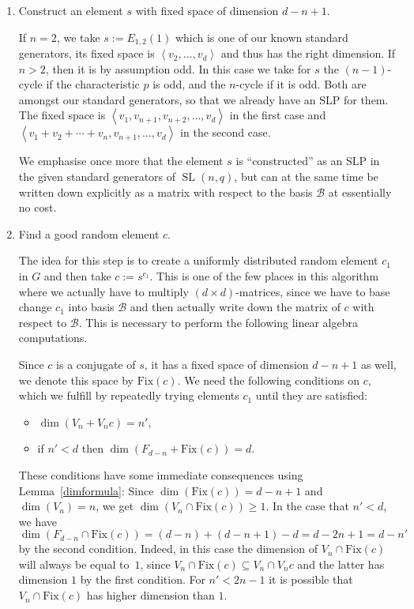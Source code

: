 \documentclass[a4paper,11pt]{article}
\def\SL{\operatorname{SL}}
\newcommand{\Fix}[1]{\mathrm{Fix}(#1)}
\newcommand{\B}{\mathcal{B}}
\begin{document}
\smallskip
\begin{enumerate}
\item Construct an element $s$ with fixed space of dimension $d-n+1$.

If $n=2$, we take $s := E_{1,2}(1)$ which is one of our known standard
generators, its fixed space is $\left< v_2, \ldots, v_d\right>$ and thus
has the right dimension. If $n > 2$, then it is by assumption odd.
In this case we take for $s$ the $(n-1)$-cycle if the characteristic $p$
is odd, and the $n$-cycle if it is odd. Both are amongst our
standard generators, so that we already have an SLP for them. The fixed
space is $\left< v_1, v_{n+1}, v_{n+2}, \ldots, v_d\right>$ in the first
case and $\left< v_1+v_2+\cdots+v_n, v_{n+1}, \ldots, v_d\right>$ in the
second case.

We emphasise once more that the element $s$ is ``constructed'' as an SLP in
the given standard generators of $\SL(n,q)$, but can at the same time be
written down explicitly as a matrix with respect to the basis $\B$ at
essentially no cost.
\item Find a good random element $c$.

The idea for this step is to create a uniformly distributed random element 
$c_1$ in $G$ and then take $c := s^{c_1}$. This is one of the few places
in this algorithm where we actually have to multiply $(d \times
d)$-matrices, since we have to base change $c_1$ into basis $\B$ and
then actually write down the matrix of $c$ with respect to $\B$. This
is necessary to perform the following linear algebra computations.

Since $c$ is a conjugate of $s$,
it has a fixed space of dimension $d-n+1$ as well, we denote this space
by $\Fix c$. We need the following
conditions on $c$, which we fulfill by repeatedly trying elements $c_1$
until they are satisfied:
\begin{itemize}
\item $\dim(V_n + V_n c) = n'$,
\item if $n' < d$ then $\dim(F_{d-n} + \Fix c) = d$.
\end{itemize}
These conditions have some immediate consequences using
Lemma~\ref{dimformula}: Since $\dim(\Fix c) =
d-n+1$ and $\dim(V_n) = n$, we get $\dim(V_n \cap \Fix c) \ge
1$. In the case that $n' < d$, we have
$\dim(F_{d-n} \cap \Fix c) = (d-n) + (d-n+1) - d = d-2n+1 = d-n'$ by 
the second condition. Indeed, in this
case the dimension of $V_n \cap \Fix c$
will always be equal to~$1$, since $V_n \cap \Fix c \subseteq V_n \cap V_n
c$ and the latter has dimension $1$ by the first condition.
For $n' < 2n-1$ it is possible that $V_n \cap \Fix c$ has higher 
dimension than $1$.


\end{enumerate}
\end{document}
